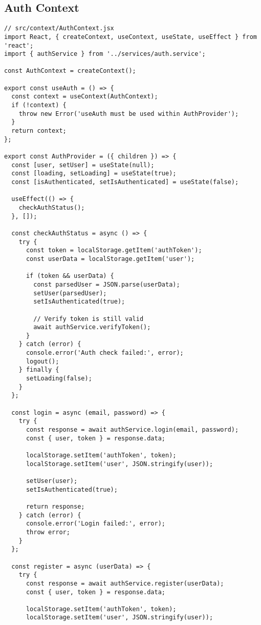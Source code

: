 \documentclass[12pt,a4paper]{article}
\begin{document}
\subsection{Auth Context}
\begin{lstlisting}[caption=Authentication Context]
// src/context/AuthContext.jsx
import React, { createContext, useContext, useState, useEffect } from 'react';
import { authService } from '../services/auth.service';

const AuthContext = createContext();

export const useAuth = () => {
  const context = useContext(AuthContext);
  if (!context) {
    throw new Error('useAuth must be used within AuthProvider');
  }
  return context;
};

export const AuthProvider = ({ children }) => {
  const [user, setUser] = useState(null);
  const [loading, setLoading] = useState(true);
  const [isAuthenticated, setIsAuthenticated] = useState(false);

  useEffect(() => {
    checkAuthStatus();
  }, []);

  const checkAuthStatus = async () => {
    try {
      const token = localStorage.getItem('authToken');
      const userData = localStorage.getItem('user');

      if (token && userData) {
        const parsedUser = JSON.parse(userData);
        setUser(parsedUser);
        setIsAuthenticated(true);
        
        // Verify token is still valid
        await authService.verifyToken();
      }
    } catch (error) {
      console.error('Auth check failed:', error);
      logout();
    } finally {
      setLoading(false);
    }
  };

  const login = async (email, password) => {
    try {
      const response = await authService.login(email, password);
      const { user, token } = response.data;

      localStorage.setItem('authToken', token);
      localStorage.setItem('user', JSON.stringify(user));
      
      setUser(user);
      setIsAuthenticated(true);

      return response;
    } catch (error) {
      console.error('Login failed:', error);
      throw error;
    }
  };

  const register = async (userData) => {
    try {
      const response = await authService.register(userData);
      const { user, token } = response.data;

      localStorage.setItem('authToken', token);
      localStorage.setItem('user', JSON.stringify(user));
      

\end{lstlisting}
\end{document}
